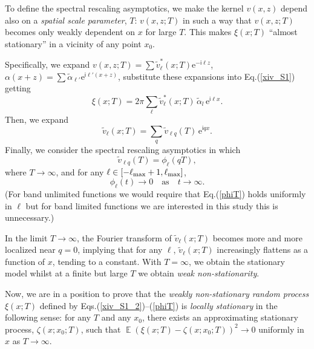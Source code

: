 \documentclass[12pt]{article}
\DeclareMathOperator{\Ex}{\mathbb{E}}
\newcommand{\e}{\mathrm{e}}
\renewcommand{\i}{\mathsf{i}}
\begin{document}
To define the spectral rescaling asymptotics, we  make the kernel $v(x,z)$ depend also on a 
{\em spatial scale parameter}, $T$:  $v(x,z;T)$ in such a way that
$v(x,z;T)$ becomes only weakly dependent on $x$
for large $T$. This  makes $\xi(x;T)$ ``almost stationary'' in a vicinity of any point $x_0$.

Specifically, we expand
$v(x, z;T)=\sum\widetilde v_\ell^*(x;T) \e^{-\i \ell z}$,
$\alpha(x+z)=\sum \widetilde \alpha_{\ell'} \e^{\i \ell' (x+z)}$, 
substitute these expansions into Eq.(\ref{xiv_S1}) getting
%
\begin {equation}
\label{xiv_S1_2}
\xi (x;T) =  2\pi \sum_\ell \widetilde v_\ell^*(x;T)  
                          \,\widetilde\alpha_{l} \, \e^{\i \ell x}.
\end {equation}
%
Then, we expand  
%
\begin {equation}
\label{vl}
\widetilde v_\ell(x;T) = \sum_q \widetilde v_{\ell q}(T) \, \e^{\i  q x}.
\end {equation}
%
Finally, we consider the spectral rescaling asymptotics in which 
%
\begin {equation}
\label{vlq}
\widetilde v_{\ell q}(T) = \phi_\ell(qT),
\end {equation}
%
where $T\to\infty$, and for any $\ell \in [ -\ell_{\rm max}+1, \ell_{\rm max} ]$,
%
\begin {equation}
\label{phiT}
\phi_\ell(t)\to 0 \quad \mbox{as} \quad t\to\infty. %
\end {equation}
%
(For band unlimited functions we would require that Eq.(\ref{phiT}) holds uniformly in $\ell$
but for band limited functions we are interested in this study this is unnecessary.)

In the limit $T\to\infty$, the Fourier transform of $\widetilde v_\ell(x;T)$ 
becomes more and more localized near $q=0$,
implying that for any $\ell$, $\widetilde v_\ell(x;T)$ increasingly flattens as a function of $x$, tending to a constant.
With $T=\infty$, we obtain the stationary model whilst at a finite but large $T$
we obtain {\em weak non-stationarity}.

Now, we are in a position to prove that the {\em weakly non-stationary random process} $\xi(x;T)$ defined by 
Eqs.(\ref{xiv_S1_2})--(\ref{phiT}) is {\em locally stationary}
in the following sense: for any $T$ and any $x_0$, there exists
an approximating stationary process, $\zeta(x;x_0;T)$, such that 
$\Ex(\xi(x;T) - \zeta(x; x_0;T))^2 \to 0$ uniformly in $x$ as $T\to\infty$.
\end{document}
